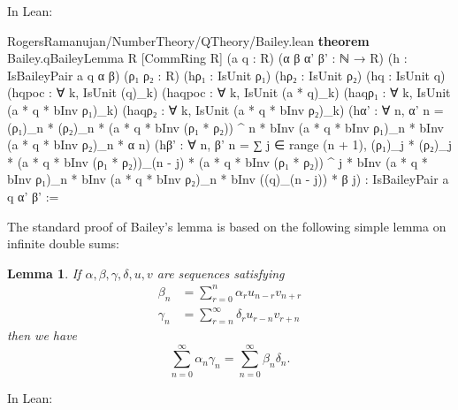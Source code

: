 \documentclass[12pt]{amsart}
\newtheorem{lemma}[theorem]{Lemma}
\theoremstyle{definition}
\theoremstyle{remark}
\numberwithin{equation}{subsection}
\newcommand{\kw}[1]{\textcolor{keywordcolor}{\textbf{#1}}}
\newcommand{\var}[1]{\textcolor{tacticcolor}{#1}}
\newcommand{\num}[1]{\textcolor{numcolor}{#1}}
\newcommand{\imp}[1]{\textcolor{commentcolor}{\textbraceleft#1\textbraceright}}
\begin{document}
In Lean:

\begin{code}{RogersRamanujan/NumberTheory/QTheory/Bailey.lean}
\kw{theorem} Bailey.qBaileyLemma \imp{R} [CommRing \var{R}] (\var{a} \var{q} : \var{R}) (\var{α} \var{β} \var{α'} \var{β'} : ℕ → \var{R}) 
  (\var{h} : IsBaileyPair \var{a} \var{q} \var{α} \var{β})
  (\var{ρ₁} \var{ρ₂} : \var{R}) (\var{hρ₁} : IsUnit \var{ρ₁}) (\var{hρ₂} : IsUnit \var{ρ₂}) (\var{hq} : IsUnit \var{q})
  (\var{hqpoc} : ∀ \var{k}, IsUnit (\var{q})_\var{k})
  (\var{haqpoc} : ∀ \var{k}, IsUnit (\var{a} * \var{q})_\var{k})
  (\var{haqρ₁} : ∀ \var{k}, IsUnit (\var{a} * \var{q} * bInv \var{ρ₁})_\var{k})
  (\var{haqρ₂} : ∀ \var{k}, IsUnit (\var{a} * \var{q} * bInv \var{ρ₂})_\var{k})
  (\var{hα'} : ∀ \var{n}, \var{α'} \var{n} = (\var{ρ₁})_\var{n} * (\var{ρ₂})_\var{n} * (\var{a} * \var{q} * bInv (\var{ρ₁} * \var{ρ₂})) ^ \var{n} *
    bInv (\var{a} * \var{q} * bInv \var{ρ₁})_\var{n} * bInv (\var{a} * \var{q} * bInv \var{ρ₂})_\var{n} * \var{α} \var{n})
  (\var{hβ'} : ∀ \var{n}, \var{β'} \var{n} = ∑ \var{j} ∈ range (\var{n} + \num{1}),
    (\var{ρ₁})_\var{j} * (\var{ρ₂})_\var{j} * (\var{a} * \var{q} * bInv (\var{ρ₁} * \var{ρ₂}))_(\var{n} - \var{j}) * (\var{a} * \var{q} * bInv (\var{ρ₁} * \var{ρ₂})) ^ \var{j} *
      bInv (\var{a} * \var{q} * bInv \var{ρ₁})_\var{n} * bInv (\var{a} * \var{q} * bInv \var{ρ₂})_\var{n} * bInv ((\var{q})_(\var{n} - \var{j})) * \var{β} \var{j}) :
  IsBaileyPair \var{a} \var{q} \var{α'} \var{β'} :=
\end{code}


The standard proof of Bailey's lemma is based on the following simple lemma on infinite double sums: 
\begin{lemma}
\label{lem:bailey-basic}
If $\alpha, \beta, \gamma, \delta, u, v$ are sequences satisfying
\begin{align}
    \beta_n &= \sum_{r=0}^{n} \alpha_r u_{n-r} v_{n+r} \label{eqn:bailey-basic-1} \\
    \gamma_n &= \sum_{r=n}^{\infty} \delta_r u_{r-n} v_{r+n} \label{eqn:bailey-basic-2}
\end{align}
then we have
\begin{equation}
    \sum_{n=0}^{\infty} \alpha_n \gamma_n = \sum_{n=0}^{\infty} \beta_n \delta_n.
\end{equation}
\end{lemma}

In Lean:
\end{document}
